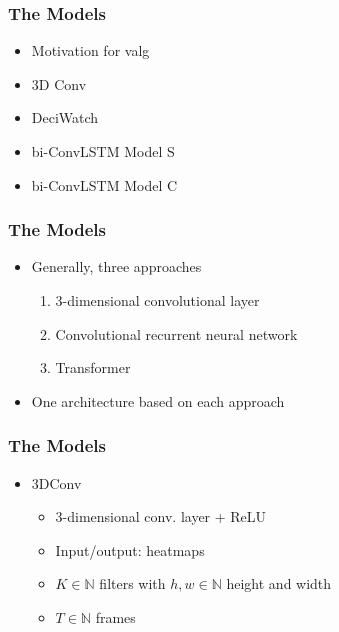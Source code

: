\documentclass{beamer}
\begin{document}
\begin{frame}
    \frametitle{The Models}
    \begin{itemize}
        \item Motivation for valg
        \item 3D Conv
        \item DeciWatch
        \item bi-ConvLSTM Model S
        \item bi-ConvLSTM Model C
    \end{itemize}
\end{frame}

\begin{frame}
    \frametitle{The Models}
    \begin{itemize}
        \item<1-> Generally, three approaches
        \begin{enumerate}
            \item 3-dimensional convolutional layer
            \item Convolutional recurrent neural network
            \item Transformer
        \end{enumerate}
        \item<2-> One architecture based on each approach
    \end{itemize}
\end{frame}

\begin{frame}
    \frametitle{The Models}
    \begin{itemize}
        \item<1-> 3DConv
        \begin{itemize}
            \item<1-> 3-dimensional conv. layer + ReLU
            \item<1-> Input/output: heatmaps
            \item<2-> $K \in \mathbb{N}$ filters with $h, w \in \mathbb{N}$ height and width
            \item<2-> $T \in \mathbb{N}$ frames
        \end{itemize}
    \end{itemize}
\end{frame}
\end{document}
